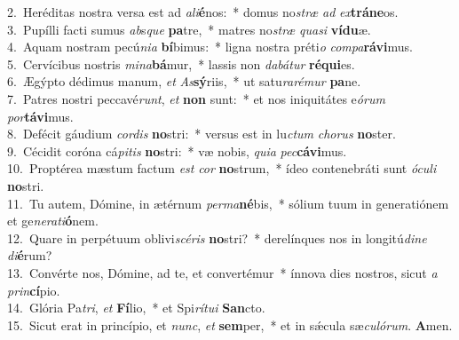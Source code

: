 {2.~}Heréditas nostra versa est ad \textit{a}\textit{li}\textbf{é}nos:~* domus no\textit{stræ} \textit{ad} \textit{ex}\textbf{trá}\textbf{ne}os.\\
{3.~}Pupílli facti sumus \textit{ab}s\textit{que} \textbf{pa}tre,~* matres no\textit{stræ} \textit{qua}\textit{si} \textbf{ví}\textbf{du}æ.\\
{4.~}Aquam nostram pecú\textit{ni}\textit{a} \textbf{bí}bimus:~* ligna nostra préti\textit{o} \textit{com}\textit{pa}\textbf{rá}\textbf{vi}mus.\\
{5.~}Cervícibus nostris \textit{mi}\textit{na}\textbf{bá}mur,~* lassis non \textit{da}\textit{bá}\textit{tur} \textbf{ré}\textbf{qui}es.\\
{6.~}Ægýpto dédimus manum, \textit{et} \textit{As}\textbf{sý}riis,~* ut satu\textit{ra}\textit{ré}\textit{mur} \textbf{pa}ne.\\
{7.~}Patres nostri peccavé\textit{runt}, \textit{et} \textbf{non} sunt:~* et nos iniquitátes e\textit{ó}\textit{rum} \textit{por}\textbf{tá}\textbf{vi}mus.\\
{8.~}Defécit gáudium \textit{cor}\textit{dis} \textbf{no}stri:~* versus est in lu\textit{ctum} \textit{cho}\textit{rus} \textbf{no}ster.\\
{9.~}Cécidit coróna cá\textit{pi}\textit{tis} \textbf{no}stri:~* væ nobis, \textit{qui}\textit{a} \textit{pec}\textbf{cá}\textbf{vi}mus.\\
{10.~}Proptérea mæstum factum \textit{est} \textit{cor} \textbf{no}strum,~* ídeo contenebráti sunt \textit{ó}\textit{cu}\textit{li} \textbf{no}stri.\\
{11.~}Tu autem, Dómine, in ætérnum \textit{per}\textit{ma}\textbf{né}bis,~* sólium tuum in generatiónem et ge\textit{ne}\textit{ra}\textit{ti}\textbf{ó}nem.\\
{12.~}Quare in perpétuum oblivi\textit{scé}\textit{ris} \textbf{no}stri?~* derelínques nos in longitú\textit{di}\textit{ne} \textit{di}\textbf{é}rum?\\
{13.~}Convérte nos, Dómine, ad te, et convertémur~* ínnova dies nostros, sicut \textit{a} \textit{prin}\textbf{cí}pio.\\
{14.~}Glória Pa\textit{tri}, \textit{et} \textbf{Fí}lio,~* et Spi\textit{rí}\textit{tu}\textit{i} \textbf{San}cto.\\
{15.~}Sicut erat in princípio, et \textit{nunc}, \textit{et} \textbf{sem}per,~* et in sǽcula sæ\textit{cu}\textit{ló}\textit{rum}. \textbf{A}men.\\
